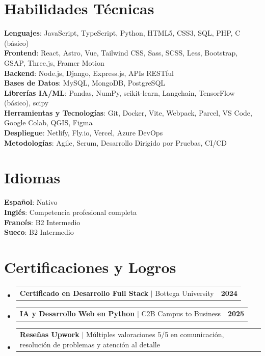 \documentclass[letterpaper,11pt]{article}
\makeatletter
\newcommand{\resumeProjectHeading}[2]{
    \item
    \begin{tabular*}{1.001\textwidth}{l@{\extracolsep{\fill}}r}
      \small#1 & \textbf{\small #2}\\
    \end{tabular*}\vspace{-7pt}
}
\newcommand{\resumeSubHeadingListStart}{\begin{itemize}[leftmargin=0.0in, label={}]}
\newcommand{\resumeSubHeadingListEnd}{\end{itemize}}
\makeatother
\begin{document}
\section{Habilidades Técnicas}
 \begin{itemize}[leftmargin=0.15in, label={}]
    \small{\item{
     \textbf{Lenguajes}{: JavaScript, TypeScript, Python, HTML5, CSS3, SQL, PHP, C (básico)} \\
     \textbf{Frontend}{: React, Astro, Vue, Tailwind CSS, Sass, SCSS, Less, Bootstrap, GSAP, Three.js, Framer Motion} \\
     \textbf{Backend}{: Node.js, Django, Express.js, APIs RESTful} \\
     \textbf{Bases de Datos}{: MySQL, MongoDB, PostgreSQL} \\
     \textbf{Librerías IA/ML}{: Pandas, NumPy, scikit-learn, Langchain, TensorFlow (básico), scipy} \\
     \textbf{Herramientas y Tecnologías}{: Git, Docker, Vite, Webpack, Parcel, VS Code, Google Colab, QGIS, Figma} \\
     \textbf{Despliegue}{: Netlify, Fly.io, Vercel, Azure DevOps} \\
     \textbf{Metodologías}{: Agile, Scrum, Desarrollo Dirigido por Pruebas, CI/CD}
    }}
 \end{itemize}
 \vspace{-16pt}

\section{Idiomas}
 \begin{itemize}[leftmargin=0.15in, label={}]
    \small{\item{
     \textbf{Español}{: Nativo} \\
     \textbf{Inglés}{: Competencia profesional completa} \\
     \textbf{Francés}{: B2 Intermedio} \\
     \textbf{Sueco}{: B2 Intermedio} \\
    }}
 \end{itemize}
 \vspace{-16pt}

\section{Certificaciones y Logros}
    \resumeSubHeadingListStart
      \resumeProjectHeading
          {\textbf{Certificado en Desarrollo Full Stack} $|$ Bottega University}{2024}
      \resumeProjectHeading
          {\textbf{IA y Desarrollo Web en Python} $|$ C2B Campus to Business}{2025}
      \resumeProjectHeading
          {\textbf{Reseñas Upwork} $|$ Múltiples valoraciones 5/5 en comunicación, resolución de problemas y atención al detalle}{}
    \resumeSubHeadingListEnd
\end{document}
